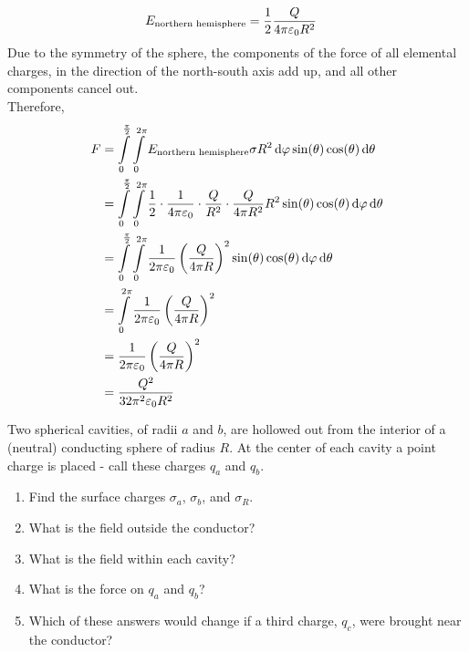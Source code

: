 \documentclass[fleqn, a4paper, 11pt, oneside]{amsart}
\theoremstyle{definition}
\theoremstyle{theorem}
\begin{document}
\begin{solution}
	\begin{align*}
		E_{\textnormal{northern hemisphere}} &= \dfrac{1}{2} \dfrac{Q}{4 \pi \varepsilon_0 R^2}
	\end{align*}
	Due to the symmetry of the sphere, the components of the force of all elemental charges, in the direction of the north-south axis add up, and all other components cancel out.\\
	Therefore,
	\begin{align*}
		F & = \int\limits_{0}^{\frac{\pi}{2}} \int\limits_{0}^{2 \pi} E_{\textnormal{northern hemisphere}} \sigma R^2 \dif \varphi \sin(\theta) \cos(\theta) \dif \theta                                                       \\
                  & = \int\limits_{0}^{\frac{\pi}{2}} \int\limits_{0}^{2 \pi} \dfrac{1}{2} \cdot \dfrac{1}{4 \pi \varepsilon_0} \cdot \dfrac{Q}{R^2} \cdot \dfrac{Q}{4 \pi R^2} R^2 \sin(\theta) \cos(\theta) \dif \varphi \dif \theta \\
                  & = \int\limits_{0}^{\frac{\pi}{2}} \int\limits_{0}^{2 \pi} \dfrac{1}{2 \pi \varepsilon_0} \left( \dfrac{Q}{4 \pi R} \right)^2 \sin(\theta) \cos(\theta) \dif \varphi \dif \theta                                    \\
                  & = \int\limits_{0}^{2 \pi} \dfrac{1}{2 \pi \varepsilon_0} \left( \dfrac{Q}{4 \pi R} \right)^2                                                                                                                        \\
                  & = \dfrac{1}{2 \pi \varepsilon_0} \left( \dfrac{Q}{4 \pi R} \right)^2                                                                                                                                                \\
                  & = \dfrac{Q^2}{32 \pi^2 \varepsilon_0 R^2}
	\end{align*}
\end{solution}

\begin{question}
	Two spherical cavities, of radii $a$ and $b$, are hollowed out from the interior of a (neutral) conducting sphere of radius $R$.
	At the center of each cavity a point charge is placed - call these charges $q_a$ and $q_b$.
	\begin{enumerate}
		\item Find the surface charges $\sigma_a$, $\sigma_b$, and $\sigma_R$.
		\item What is the field outside the conductor?
		\item What is the field within each cavity?
		\item What is the force on $q_a$ and $q_b$?
		\item Which of these answers would change if a third charge, $q_c$, were brought near the conductor?
	\end{enumerate}
\end{question}
\end{document}
